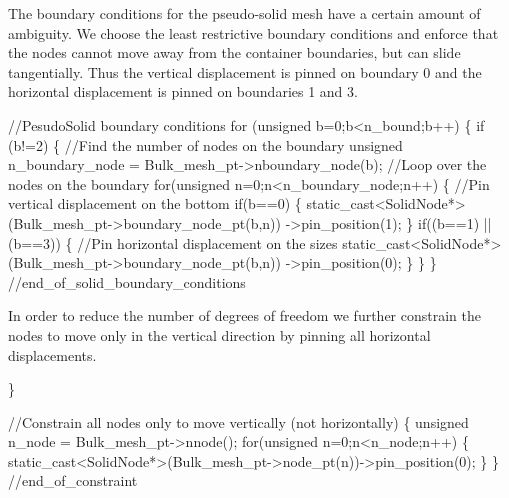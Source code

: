The boundary conditions for the pseudo-\/solid mesh have a certain amount of ambiguity. We choose the least restrictive boundary conditions and enforce that the nodes cannot move away from the container boundaries, but can slide tangentially. Thus the vertical displacement is pinned on boundary 0 and the horizontal displacement is pinned on boundaries 1 and 3.


\begin{DoxyCodeInclude}

 \textcolor{comment}{//PesudoSolid boundary conditions}
 \textcolor{keywordflow}{for} (\textcolor{keywordtype}{unsigned} b=0;b<n\_bound;b++)
  \{
   \textcolor{keywordflow}{if} (b!=2)
    \{
     \textcolor{comment}{//Find the number of nodes on the boundary}
     \textcolor{keywordtype}{unsigned} n\_boundary\_node = Bulk\_mesh\_pt->nboundary\_node(b);
     \textcolor{comment}{//Loop over the nodes on the boundary}
     \textcolor{keywordflow}{for}(\textcolor{keywordtype}{unsigned} n=0;n<n\_boundary\_node;n++)
      \{
       \textcolor{comment}{//Pin vertical displacement on the bottom}
       \textcolor{keywordflow}{if}(b==0)
        \{
         \textcolor{keyword}{static\_cast<}SolidNode*\textcolor{keyword}{>}(Bulk\_mesh\_pt->boundary\_node\_pt(b,n))
          ->pin\_position(1);
        \}
       \textcolor{keywordflow}{if}((b==1) || (b==3))
        \{
         \textcolor{comment}{//Pin horizontal displacement on the sizes}
         \textcolor{keyword}{static\_cast<}SolidNode*\textcolor{keyword}{>}(Bulk\_mesh\_pt->boundary\_node\_pt(b,n))
          ->pin\_position(0);
        \}
      \}
    \} \textcolor{comment}{//end\_of\_solid\_boundary\_conditions}

\end{DoxyCodeInclude}


In order to reduce the number of degrees of freedom we further constrain the nodes to move only in the vertical direction by pinning all horizontal displacements.


\begin{DoxyCodeInclude}
  \}

 \textcolor{comment}{//Constrain all nodes only to move vertically (not horizontally)}
 \{
  \textcolor{keywordtype}{unsigned} n\_node = Bulk\_mesh\_pt->nnode();
  \textcolor{keywordflow}{for}(\textcolor{keywordtype}{unsigned} n=0;n<n\_node;n++)
   \{
    \textcolor{keyword}{static\_cast<}SolidNode*\textcolor{keyword}{>}(Bulk\_mesh\_pt->node\_pt(n))->pin\_position(0);
   \}
 \} \textcolor{comment}{//end\_of\_constraint}

\end{DoxyCodeInclude}


